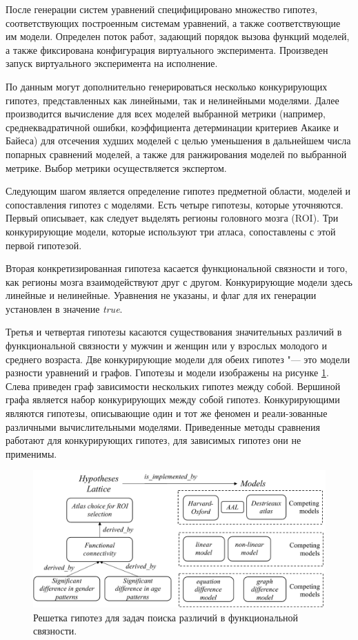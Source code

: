 После генерации систем уравнений специфицировано множество гипотез, соответствующих построенным системам уравнений, 
а также соответствующие им модели. Определен поток работ, задающий порядок вызова функций моделей, а также 
фиксирована конфигурация виртуального эксперимента. Произведен запуск виртуального эксперимента на исполнение.

По данным могут дополнительно генерироваться несколько конкурирующих гипотез, 
представленных как линейными, так и нелинейными моделями. Далее производится вычисление 
для всех моделей выбранной метрики (например, среднеквадратичной ошибки, коэффициента детерминации критериев 
Акаике и Байеса) для отсечения худших моделей с целью уменьшения в дальнейшем числа попарных сравнений моделей, 
а также для ранжирования моделей по выбранной метрике. Выбор метрики осуществляется экспертом. 

Следующим шагом является определение гипотез предметной области, моделей и сопоставления гипотез с моделями. 
Есть четыре гипотезы, которые уточняются. Первый описывает, как следует выделять регионы головного мозга (ROI). 
Три конкурирующие модели, которые используют три атласа, сопоставлены с этой первой гипотезой. 

Вторая конкретизированная гипотеза касается функциональной связности и того, как регионы мозга 
взаимодействуют друг с другом. 
Конкурирующие модели здесь линейные и нелинейные. Уравнения не указаны, и флаг для их генерации 
установлен в значение \textit{true}. 

Третья и четвертая гипотезы касаются существования значительных различий в функциональной связности у 
мужчин и женщин или у взрослых молодого и среднего возраста. Две конкурирующие модели для обеих гипотез "--- это 
модели разности уравнений и графов. Гипотезы и модели изображены на рисунке \cref{fig:Hypothesis_lattice}. 
Слева приведен граф зависимости нескольких гипотез между собой. 
Вершиной графа является набор конкурирующих между собой гипотез. Конкурирующими являются гипотезы, описывающие 
один и тот же феномен и реали-зованные различными вычислительными моделями. Приведенные методы сравнения работают 
для конкурирующих гипотез, для зависимых гипотез они не применимы.

\begin{figure}[ht]
    \centering
    \includegraphics[width=1.0\linewidth]{images/Hypothesis_Lattice.pdf}
    \caption{Решетка гипотез для задач поиска различий в функциональной связности.}\label{fig:Hypothesis_lattice}
\end{figure}

